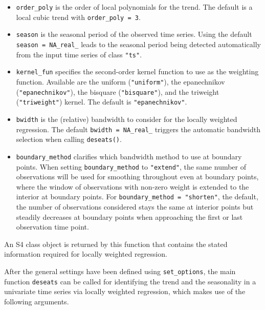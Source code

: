 \begin{itemize}
\tightlist
\item
  \texttt{order\_poly} is the order of local polynomials for the trend. The default is a local cubic trend with \texttt{order\_poly\ =\ 3}.
\item
  \texttt{season} is the seasonal period of the observed time series. Using the default \texttt{season\ =\ NA\_real\_} leads to the seasonal period being detected automatically from the input time series of class \texttt{"ts"}.
\item
  \texttt{kernel\_fun} specifies the second-order kernel function to use as the weighting function. Available are the uniform (\texttt{"uniform"}), the epanechnikov (\texttt{"epanechnikov"}), the bisquare (\texttt{"bisquare"}), and the triweight (\texttt{"triweight"}) kernel. The default is \texttt{"epanechnikov"}.
\item
  \texttt{bwidth} is the (relative) bandwidth to consider for the locally weighted regression. The default \texttt{bwidth\ =\ NA\_real\_} triggers the automatic bandwidth selection when calling \texttt{deseats()}.
\item
  \texttt{boundary\_method} clarifies which bandwidth method to use at boundary points. When setting \texttt{boundary\_method} to \texttt{"extend"}, the same number of observations will be used for smoothing throughout even at boundary points, where the window of observations with non-zero weight is extended to the interior at boundary points. For \texttt{boundary\_method\ =\ "shorten"}, the default, the number of observations considered stays the same at interior points but steadily decreases at boundary points when approaching the first or last observation time point.
\end{itemize}

\noindent An S4 class object is returned by this function that contains the stated information required for locally weighted regression.

After the general settings have been defined using \texttt{set\_options}, the main function \texttt{deseats} can be called for identifying the trend and the seasonality in a univariate time series via locally weighted regression, which makes use of the following arguments.

